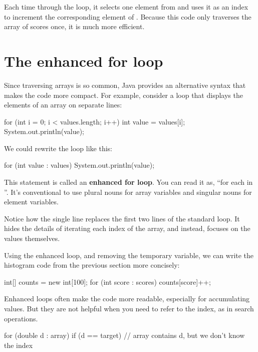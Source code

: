 Each time through the loop, it selects one element from  and uses it as an index to increment the corresponding element of .
Because this code only traverses the array of scores once, it is much more efficient.


\section{The enhanced for loop}
\label{enhanced}

Since traversing arrays is so common, Java provides an alternative syntax that makes the code more compact.
For example, consider a  loop that displays the elements of an array on separate lines:

\begin{code}
for (int i = 0; i < values.length; i++) {
    int value = values[i];
    System.out.println(value);
}
\end{code}

We could rewrite the loop like this:

\begin{code}
for (int value : values) {
    System.out.println(value);
}
\end{code}


This statement is called an {\bf enhanced for loop}.
You can read it as, ``for each  in ''.
It's conventional to use plural nouns for array variables and singular nouns for element variables.

Notice how the single line  replaces the first two lines of the standard  loop.
It hides the details of iterating each index of the array, and instead, focuses on the values themselves.

Using the enhanced  loop, and removing the temporary variable, we can write the histogram code from the previous section more concisely:

\begin{code}
int[] counts = new int[100];
for (int score : scores) {
    counts[score]++;
}
\end{code}

Enhanced  loops often make the code more readable, especially for accumulating values.
But they are not helpful when you need to refer to the index, as in search operations.

\begin{code}
for (double d : array) {
    if (d == target) {
        // array contains d, but we don't know the index
    }
}
\end{code}

